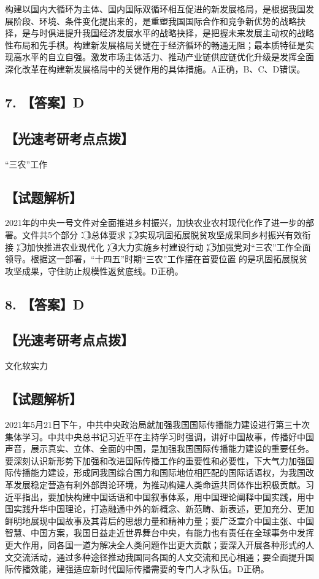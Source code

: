 \documentclass[UTF8,11pt]{ctexart}
\begin{document}
构建以国内大循环为主体、国内国际双循环相互促进的新发展格局，是根据我国发展阶段、环境、条件变化提出来的，是重塑我国国际合作和竞争新优势的战略抉择，是与时俱进提升我国经济发展水平的战略抉择，是把握未来发展主动权的战略性布局和先手棋。构建新发展格局关键在于经济循环的畅通无阻；最本质特征是实现高水平的自立自强。激发市场主体活力、推动产业链供应链优化升级是发挥全面深化改革在构建新发展格局中的关键作用的具体措施。A正确，B、C、D错误。


\subsection*{7. 【答案】D}

\subsection*{【光速考研考点点拨】}

“三农”工作


\subsection*{【试题解析】}

2021年的中央一号文件对全面推进乡村振兴，加快农业农村现代化作了进一步的部署。文件共5个部分：\textcircled{1}总体要求；\textcircled{2}实现巩固拓展脱贫攻坚成果同乡村振兴有效衔接；\textcircled{3}加快推进农业现代化；\textcircled{4}大力实施乡村建设行动；\textcircled{5}加强党对“三农”工作全面领导。根据这一部署，“十四五”时期“三农”工作摆在首要位置 的是巩固拓展脱贫攻坚成果，守住防止规模性返贫底线。D正确。


\subsection*{8. 【答案】D}

\subsection*{【光速考研考点点拨】}

文化软实力


\subsection*{【试题解析】}

2021年5月21日下午，中共中央政治局就加强我国国际传播能力建设进行第三十次集体学习。中共中央总书记习近平在主持学习时强调，讲好中国故事，传播好中国声音，展示真实、立体、全面的中国，是加强我国国际传播能力建设的重要任务。要深刻认识新形势下加强和改进国际传播工作的重要性和必要性，下大气力加强国际传播能力建设，形成同我国综合国力和国际地位相匹配的国际话语权，为我国改革发展稳定营造有利外部舆论环境，为推动构建人类命运共同体作出积极贡献。习近平指出，要加快构建中国话语和中国叙事体系，用中国理论阐释中国实践，用中国实践升华中国理论，打造融通中外的新概念、新范畴、新表述，更加充分、更加鲜明地展现中国故事及其背后的思想力量和精神力量；要广泛宣介中国主张、中国智慧、中国方案，我国日益走近世界舞台中央，有能力也有责任在全球事务中发挥更大作用，同各国一道为解决全人类问题作出更大贡献；要深入开展各种形式的人文交流活动，通过多种途径推动我国同各国的人文交流和民心相通；要全面提升国际传播效能，建强适应新时代国际传播需要的专门人才队伍。D正确。
\end{document}
